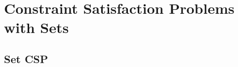 \documentclass[3p,authoryear,times]{elsarticle}
\newcommand{\rmin}[0]{{\Rightarrow_{red}}}
\newcommand{\enc}[0]{\Leftrightarrow_{enc}}
\newcommand{\oenc}[0]{\Leftrightarrow_{encX}}
\begin{document}




\color{red}
\section{Constraint Satisfaction Problems with Sets}
\label{sec:csp}

\subsection{Set CSP}
\end{document}
